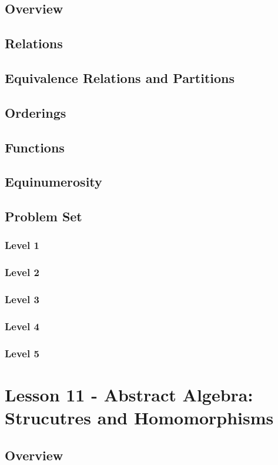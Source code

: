 \documentclass{article}
\begin{document}
\subsection{Overview}
\subsection{Relations}
\subsection{Equivalence Relations and Partitions}
\subsection{Orderings}
\subsection{Functions}
\subsection{Equinumerosity}
\subsection{Problem Set}
\subsubsection{Level 1}
\subsubsection{Level 2}
\subsubsection{Level 3}
\subsubsection{Level 4}
\subsubsection{Level 5}
\pagebreak

\section{Lesson 11 - Abstract Algebra: Strucutres and Homomorphisms}
\subsection{Overview}
\end{document}
